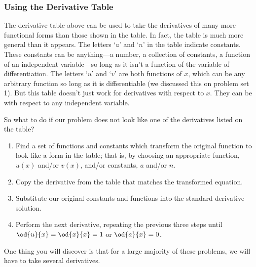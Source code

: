\documentclass[final,a4paper,12pt]{article}
\theoremstyle{definition}
\begin{document}
\subsubsection{Using the Derivative Table}
The derivative table above can be used to take the derivatives of many more
functional forms than those shown in the table.  In fact, the table is much more
general than it appears.  The letters `$a$' and `$n$' in the table indicate
constants.  These constants can be anything---a number, a collection of
constants, a function of an independent variable---so long as it isn't a
function of the variable of differentiation.  The letters `$u$' and `$v$' are
both functions of $x$, which can be any arbitrary function so long as it is
differentiable (we discussed this on problem set 1).  But this table doesn't
just work for derivatives with respect to $x$.  They can be with respect to any
independent variable.

So what to do if our problem does not look like one of the derivatives listed on
the table?
\begin{enumerate}
    \item Find a set of functions and constants which transform the original
    function to look like a form in the table; that is, by choosing an appropriate
    function, $u(x)$ and/or $v(x)$, and/or constants, $a$ and/or $n$.

    \item Copy the derivative from the table that matches the transformed
    equation.

    \item Substitute our original constants and functions into the standard
    derivative solution.

    \item Perform the next derivative, repeating the previous three steps until
    $\od{u}{x} = \od{x}{x} = 1$ or $\od{a}{x} = 0$.
\end{enumerate}

One thing you will discover is that for a large majority of these problems, we will
have to take several derivatives.
\end{document}

